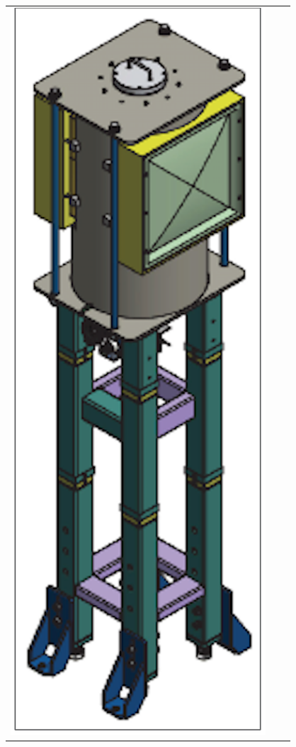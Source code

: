 \begin{figure}[htp]
\centering
\begin{tabular}{ccc}
\hspace{-0.2cm}
\includegraphics[scale=0.5]{fig/wincc/irradiator.pdf}

\end{tabular}
\end{figure}
